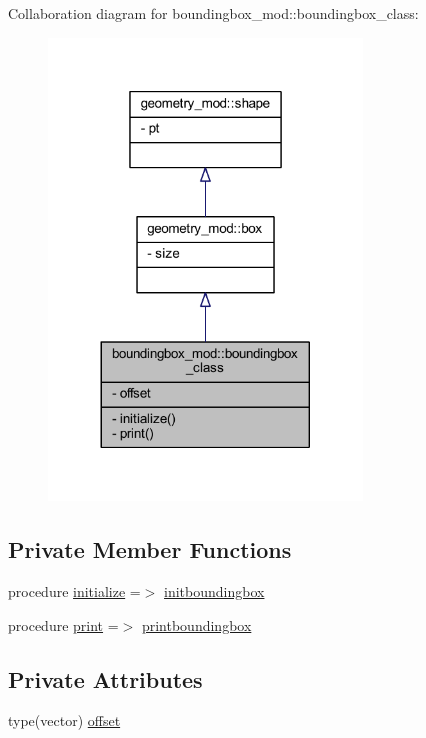 Collaboration diagram for boundingbox\+\_\+mod\+:\+:boundingbox\+\_\+class\+:\nopagebreak
\begin{figure}[H]
\begin{center}
\leavevmode
\includegraphics[width=236pt]{structboundingbox__mod_1_1boundingbox__class__coll__graph}
\end{center}
\end{figure}
\subsection*{Private Member Functions}
\begin{DoxyCompactItemize}
\item 
procedure \mbox{\hyperlink{structboundingbox__mod_1_1boundingbox__class_a21f88c3fc204dab330d98c85728994c1}{initialize}} =$>$ \mbox{\hyperlink{namespaceboundingbox__mod_a35e41bb92c19802441dd8d748c3acfb4}{initboundingbox}}
\item 
procedure \mbox{\hyperlink{structboundingbox__mod_1_1boundingbox__class_aac90c83bef1a3156893cc0cb5d5647e6}{print}} =$>$ \mbox{\hyperlink{namespaceboundingbox__mod_a6ec461b758bc180dc72b5fb23169feca}{printboundingbox}}
\end{DoxyCompactItemize}
\subsection*{Private Attributes}
\begin{DoxyCompactItemize}
\item 
type(vector) \mbox{\hyperlink{structboundingbox__mod_1_1boundingbox__class_a49a3cc9011829c2e1fbbbffa76580f63}{offset}}
\end{DoxyCompactItemize}


